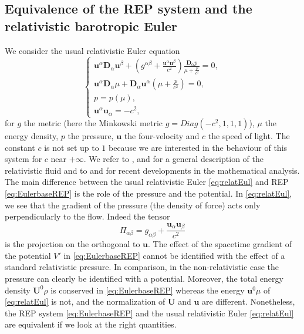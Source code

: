 \documentclass[a4paper, 15pt]{article}
\numberwithin{equation}{section}
\begin{document}
\subsection{Equivalence of the REP system and the relativistic barotropic Euler}
\label{subsection:relatEullink}
We consider the usual relativistic Euler equation 
\begin{equation}
    \begin{cases}
    \label{eq:relatEul}
        \textbf{u}^\alpha\textbf{D}_\alpha \textbf{u}^\beta+(g^{\alpha\beta}+\frac{\textbf{u}^\alpha \textbf{u}^\beta}{c^2})\frac{\textbf{D}_\alpha p}{\mu+\frac{p}{c^2}}=0,\\
        \textbf{u}^\alpha\textbf{D}_\alpha\mu+\textbf{D}_\alpha \textbf{u}^\alpha(\mu+\frac{p}{c^2})=0,\\
        p=p(\mu),\\
        \textbf{u}^\alpha \textbf{u}_\alpha=-c^2,
    \end{cases}
\end{equation}
for $g$ the metric (here the Minkowski metric $g=Diag(-c^2,1,1,1)$), $\mu$ the energy density, $p$ the pressure, $\textbf{u}$ the four-velocity and $c$ the speed of light. The constant $c$ is not set up to $1$ because we are interested in the behaviour of this system for $c$ near $+\infty$. We refer to \cite{Gourgoulhon_2006}, \cite{Andersson_2021} and \cite{zbMATH05382453} for a general description of the relativistic fluid and to \cite{zbMATH07783487} and \cite{disconzi2023recent} for recent developments in the mathematical analysis.\\
The main difference between the usual relativistic Euler \eqref{eq:relatEul} and REP \eqref{eq:EulerbaseREP} is the role of the pressure and the potential. In \eqref{eq:relatEul}, we see that the gradient of the pressure (the density of force) acts only perpendicularly to the flow. Indeed the tensor 
\begin{equation}
 \label{eq:projector}
    \Pi_{\alpha\beta}=g_{\alpha\beta}+\frac{\textbf{u}_\alpha \textbf{u}_\beta}{c^2}
\end{equation}
is the projection on the orthogonal to $\textbf{u}$. The effect of the spacetime gradient of the potential $V'$ in \eqref{eq:EulerbaseREP} cannot be identified with the effect of a standard relativistic pressure. In comparison, in the non-relativistic case the pressure can clearly be identified with a potential. Moreover, the total energy density $\textbf{U}^0\rho$ is conserved in \eqref{eq:EulerbaseREP} whereas the energy $\textbf{u}^0\mu$ of \eqref{eq:relatEul} is not, and the normalization of $\textbf{U}$ and $\textbf{u}$ are different. Nonetheless, the REP system \eqref{eq:EulerbaseREP} and the usual relativistic Euler \eqref{eq:relatEul} are equivalent if we look at the right quantities.\\
\end{document}
